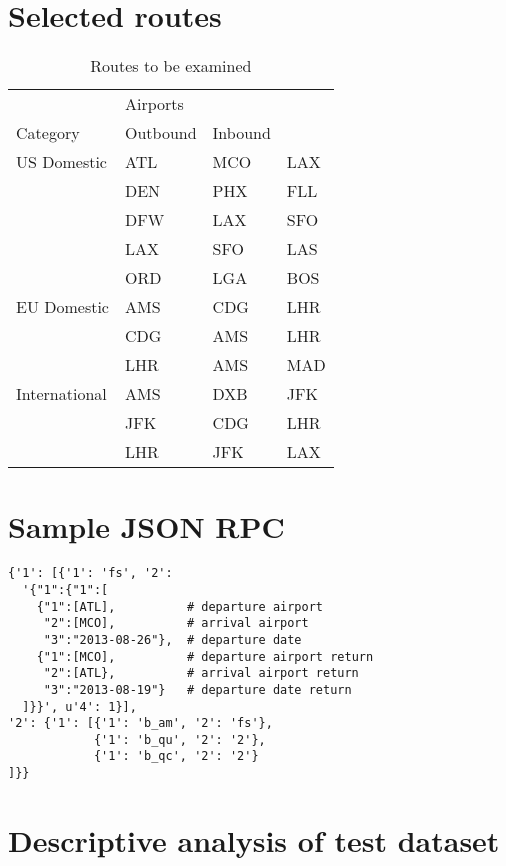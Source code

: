 \chapter{Selected routes}
\label{app:SelectedRoutes}
\begin{table}[h]
	\centering
    \begin{tabular}{ l l l l }
        \toprule
        ~           & Airports & ~ \\
        \cmidrule{2-4}
        Category        & Outbound & Inbound        \\
        \midrule
        US Domestic & ATL & MCO & LAX \\
        ~           & DEN & PHX & FLL \\
        ~           & DFW & LAX & SFO \\
        ~           & LAX & SFO & LAS \\
        ~           & ORD & LGA & BOS \\
        EU Domestic & AMS & CDG & LHR \\
		~           & CDG & AMS & LHR \\
		~           & LHR & AMS & MAD \\
        International & AMS & DXB & JFK \\
        ~             & JFK & CDG & LHR \\
        ~             & LHR & JFK & LAX \\
        \bottomrule
    \end{tabular}
	\caption{Routes to be examined}
\end{table}



\chapter{Sample JSON RPC}
\label{app:SampleJSONRPC}
\small
\begin{verbatim}
{'1': [{'1': 'fs', '2':
  '{"1":{"1":[
    {"1":[ATL],          # departure airport
     "2":[MCO],          # arrival airport
     "3":"2013-08-26"},  # departure date
    {"1":[MCO],          # departure airport return
     "2":[ATL},          # arrival airport return
     "3":"2013-08-19"}   # departure date return
  ]}}', u'4': 1}],
'2': {'1': [{'1': 'b_am', '2': 'fs'},
            {'1': 'b_qu', '2': '2'},
            {'1': 'b_qc', '2': '2'}
]}}
\end{verbatim}



\chapter{Descriptive analysis of test dataset}
\label{app:DescAnalysisTest}

